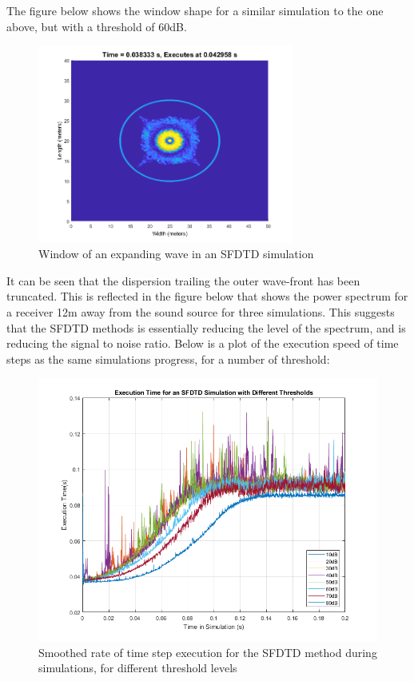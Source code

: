 The figure below shows the window shape for a similar simulation to the one above, but with a threshold of 60dB.\\
\begin{figure}[H]
\centering
  \includegraphics[width=0.75\textwidth]{./graphics/Example Window 3 60 threshold.png}
  \caption{Window of an expanding wave in an SFDTD simulation}
\end{figure}

It can be seen that the dispersion trailing the outer wave-front has been truncated. This is reflected in the figure below that shows the power spectrum for a receiver 12m away from the sound source for three simulations. This suggests that the SFDTD methods is essentially reducing the level of the spectrum, and is reducing the signal to noise ratio. Below is a plot of the execution speed of time steps as the same simulations progress, for a number of threshold: \\

\begin{figure}[H]
\centering
  \includegraphics[width=\textwidth]{./graphics/sfdtd execution speed.png}
  \caption{Smoothed rate of time step execution for the SFDTD method during simulations, for different threshold levels}
\end{figure}

